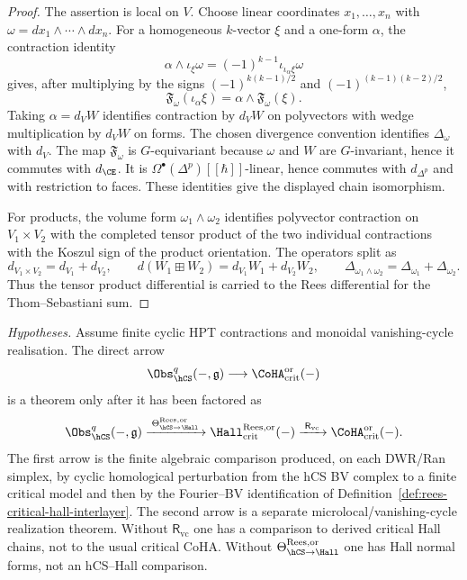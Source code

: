 \begin{proof}
The assertion is local on $V$. Choose linear coordinates
$x_1,\ldots,x_n$ with
$\omega=dx_1\wedge\cdots\wedge dx_n$. For a homogeneous $k$-vector
$\xi$ and a one-form $\alpha$, the contraction identity
\[
 \alpha\wedge\iota_\xi\omega
 =
 (-1)^{k-1}\iota_{\iota_\alpha\xi}\omega
\]
gives, after multiplying by the signs
$(-1)^{k(k-1)/2}$ and $(-1)^{(k-1)(k-2)/2}$,
\[
 \mathfrak F_\omega(\iota_\alpha\xi)
 =
 \alpha\wedge\mathfrak F_\omega(\xi).
\]
Taking $\alpha=d_VW$ identifies contraction by $d_VW$ on polyvectors
with wedge multiplication by $d_VW$ on forms. The chosen divergence
convention identifies $\Delta_\omega$ with $d_V$. The map
$\mathfrak F_\omega$ is $G$-equivariant because $\omega$ and $W$ are
$G$-invariant, hence it commutes with $d_{\CE}$. It is
$\Omega^\bullet(\Delta^p)[[\hbar]]$-linear, hence commutes with
$d_{\Delta^p}$ and with restriction to faces. These identities give the
displayed chain isomorphism.

For products, the volume form
$\omega_1\wedge\omega_2$ identifies polyvector contraction on
$V_1\times V_2$ with the completed tensor product of the two individual
contractions with the Koszul sign of the product orientation. The
operators split as
\[
 d_{V_1\times V_2}=d_{V_1}+d_{V_2},\qquad
 d(W_1\boxplus W_2)=d_{V_1}W_1+d_{V_2}W_2,\qquad
 \Delta_{\omega_1\wedge\omega_2}
 =\Delta_{\omega_1}+\Delta_{\omega_2}.
\]
Thus the tensor product differential is carried to the Rees
differential for the Thom--Sebastiani sum.
\end{proof}

\begin{proposition}
\label{prop:rees-split-hcs-hall-target}
\noindent\emph{Hypotheses.} Assume finite cyclic HPT contractions and
monoidal vanishing-cycle realisation.
The direct arrow
\[
 \Obs_{\hCS}^{q}(-,\mathfrak g)
 \longrightarrow
 \CoHA_{\mathrm{crit}}^{\mathrm{or}}(-)
\]
is a theorem only after it has been factored as
\[
 \Obs_{\hCS}^{q}(-,\mathfrak g)
 \xrightarrow{\;\Theta_{\hCS\to\Hall}^{\mathrm{Rees},\mathrm{or}}\;}
 \Hall_{\mathrm{crit}}^{\mathrm{Rees},\mathrm{or}}(-)
 \xrightarrow{\;\mathsf R_{\mathrm{vc}}\;}
 \CoHA_{\mathrm{crit}}^{\mathrm{or}}(-).
\]
The first arrow is the finite algebraic comparison produced, on each
DWR/Ran simplex, by cyclic homological perturbation from the hCS BV
complex to a finite critical model and then by the Fourier--BV
identification of Definition~\ref{def:rees-critical-hall-interlayer}.
The second arrow is a separate microlocal/vanishing-cycle realization
theorem. Without $\mathsf R_{\mathrm{vc}}$ one has a comparison to
derived critical Hall chains, not to the usual critical CoHA. Without
$\Theta_{\hCS\to\Hall}^{\mathrm{Rees},\mathrm{or}}$ one has Hall normal
forms, not an hCS--Hall comparison.
\end{proposition}


